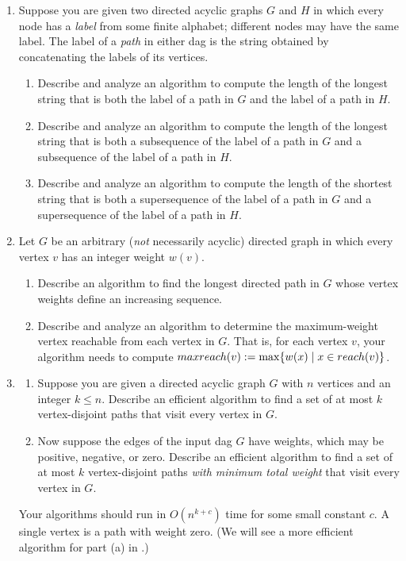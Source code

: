 \begin{exercises}
\begin{enumerate}[label=\arabic*.,ref=\thechapter.\arabic*,leftmargin=*,align=left,itemsep=1.5ex plus 0.5ex,start=12]
\item Suppose you are given two directed acyclic graphs $G$ and $H$ in which every node has a \textit{label} from some finite alphabet; different nodes may have the same label.
The label of a \textit{path} in either dag is the string obtained by concatenating the labels of its vertices.
\begin{enumerate}
\item Describe and analyze an algorithm to compute the length of the longest string that is both the label of a path in $G$ and the label of a path in $H$.
\item Describe and analyze an algorithm to compute the length of the longest string that is both a subsequence of the label of a path in $G$ and a subsequence of the label of a path in $H$.
\item Describe and analyze an algorithm to compute the length of the shortest string that is both a supersequence of the label of a path in $G$ and a supersequence of the label of a path in $H$.
\end{enumerate}

\item Let $G$ be an arbitrary (\textit{not} necessarily acyclic) directed graph in which every vertex $v$ has an integer weight $w(v)$.
\begin{enumerate}
\item Describe an algorithm to find the longest directed path in $G$ whose vertex weights define an increasing sequence.
\item Describe and analyze an algorithm to determine the maximum-weight vertex reachable from each vertex in $G$.
That is, for each vertex $v$, your algorithm needs to compute $maxreach(v) := \max\{w(x) \mathrel{|} x \in reach(v)\}$.
\end{enumerate}

\item
\begin{enumerate}
\item Suppose you are given a directed acyclic graph $G$ with $n$ vertices and an integer $k \le n$.
Describe an efficient algorithm to find a set of at most $k$ vertex-disjoint paths that visit every vertex in $G$.
\item Now suppose the edges of the input dag $G$ have weights, which may be positive, negative, or zero.
Describe an efficient algorithm to find a set of at most $k$ vertex-disjoint paths \textit{with minimum total weight} that visit every vertex in $G$.
\end{enumerate}
Your algorithms should run in $O(n^{k+c})$ time for some small constant $c$.
A single vertex is a path with weight zero.
(We will see a more efficient algorithm for part (a) in .)


\end{enumerate}
\end{exercises}
